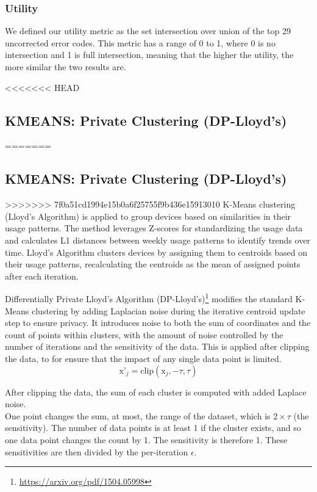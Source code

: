 \documentclass[12pt,letterpaper]{article}
\begin{document}
\subsubsection{Utility}

We defined our utility metric as the set intersection over union of the top 29 uncorrected error codes.
This metric has a range of 0 to 1, where 0 is no intersection and 1 is full intersection,
meaning that the higher the utility, the more similar the two results are.

<<<<<<< HEAD
\subsection{KMEANS: Private Clustering (DP-Lloyd's)}
=======

\subsection{KMEANS: Private Clustering (DP-Lloyd's)}

>>>>>>> 7f0a51cd1994e15b0a6f25755f9b436e15913010
K-Means clustering (Lloyd's Algorithm) is applied to group devices based on similarities in their usage patterns. The method leverages Z-scores for standardizing the usage data and calculates L1 distances between weekly usage patterns to identify trends over time. Lloyd's Algorithm clusters devices by assigning them to centroids based on their usage patterns, recalculating the centroids as the mean of assigned points after each iteration. 

Differentially Private Lloyd's Algorithm (DP-Lloyd's)\footnote{\url{https://arxiv.org/pdf/1504.05998}} modifies the standard K-Means clustering by adding Laplacian noise during the iterative centroid update step to ensure privacy. It introduces noise to both the sum of coordinates and the count of points within clusters, with the amount of noise controlled by the number of iterations and the sensitivity of the data. This is applied after clipping the data, to for ensure that the impact of any single data point is limited. 
\[
\text{x'}_j = \text{clip}\left( \text{x}_j, -\tau, \tau \right)
\]

After clipping the data, the sum of each cluster is computed with added Laplace noise. \\
One point changes the sum, at most, the range of the dataset, which is \(2 \times \tau\) (the sensitivity). The number of data points is at least 1 if the cluster exists, and so one data point changes the count by 1. The sensitivity is therefore 1. These sensitivities are then divided by the per-iteration  $\epsilon$.
\end{document}
